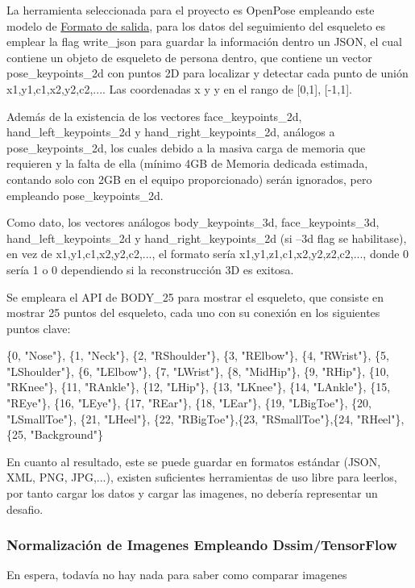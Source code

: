 La herramienta seleccionada para el proyecto es OpenPose empleando este modelo de \href{https://github.com/CMU-Perceptual-Computing-Lab/openpose/blob/master/doc/output.md}{Formato de salida}, para los datos del seguimiento del esqueleto es emplear la flag write\_json para guardar la información dentro un JSON, el cual contiene un objeto de esqueleto de persona dentro, que contiene un vector pose\_keypoints\_2d con puntos 2D para localizar y detectar cada punto de unión x1,y1,c1,x2,y2,c2,.... Las coordenadas x y y en el rango de [0,1], [-1,1].

Además de la existencia de los vectores face\_keypoints\_2d, hand\_left\_keypoints\_2d y hand\_right\_keypoints\_2d, análogos a pose\_keypoints\_2d, los cuales debido a la masiva carga de memoria que requieren y la falta de ella (mínimo 4GB de Memoria dedicada estimada, contando solo con 2GB en el equipo proporcionado) serán ignorados, pero empleando pose\_keypoints\_2d.

Como dato, los vectores análogos body\_keypoints\_3d, face\_keypoints\_3d,
hand\_left\_keypoints\_2d y hand\_right\_keypoints\_2d (si --3d flag se habilitase), en vez de 
x1,y1,c1,x2,y2,c2,..., el formato sería x1,y1,z1,c1,x2,y2,z2,c2,..., donde 0 sería 1 o 0 dependiendo si la reconstrucción 3D es exitosa.

Se empleara el API de BODY\_25 para mostrar el esqueleto, que consiste en mostrar 25 puntos del esqueleto, cada uno con su conexión en los siguientes puntos clave:

\{0,  "Nose"\}, \{1,  "Neck"\}, \{2,  "RShoulder"\}, \{3,  "RElbow"\}, \{4,  "RWrist"\}, 
\{5,  "LShoulder"\}, \{6,  "LElbow"\}, \{7,  "LWrist"\}, \{8,  "MidHip"\}, \{9,  "RHip"\},
\{10, "RKnee"\}, \{11, "RAnkle"\}, \{12, "LHip"\}, \{13, "LKnee"\}, \{14, "LAnkle"\}, 
\{15, "REye"\}, \{16, "LEye"\}, \{17, "REar"\}, \{18, "LEar"\}, \{19, "LBigToe"\},
\{20, "LSmallToe"\}, \{21, "LHeel"\}, \{22, "RBigToe"\},\{23, "RSmallToe"\},\{24, "RHeel"\},
\{25, "Background"\}


En cuanto al resultado, este se puede guardar en formatos estándar (JSON, XML, PNG, JPG,...), existen suficientes herramientas de uso libre para leerlos, por tanto cargar los datos y cargar las imagenes, no debería representar un desafio.



\subsubsection{Normalización de Imagenes Empleando Dssim/TensorFlow}

En espera, todavía no hay nada para saber como comparar imagenes




